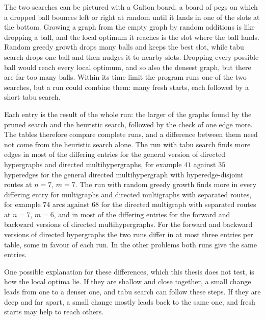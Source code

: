 The two searches can be pictured with a Galton board, a board of pegs on which a dropped ball bounces left or right at random until it lands in one of the slots at the bottom.
Growing a graph from the empty graph by random additions is like dropping a ball, and the local optimum it reaches is the slot where the ball lands.
Random greedy growth drops many balls and keeps the best slot, while tabu search drops one ball and then nudges it to nearby slots.
Dropping every possible ball would reach every local optimum, and so also the densest graph, but there are far too many balls.
Within its time limit the program runs one of the two searches, but a run could combine them: many fresh starts, each followed by a short tabu search.

Each entry is the result of the whole run: the larger of the graphs found by the pruned search and the heuristic search, followed by the check of one edge more. The tables therefore compare complete runs, and a difference between them need not come from the heuristic search alone.
The run with tabu search finds more edges in most of the differing entries for the general version of directed hypergraphs and directed multihypergraphs, for example $41$ against $35$ hyperedges for the general directed multihypergraph with hyperedge-disjoint routes at $n=7$, $m=7$.
The run with random greedy growth finds more in every differing entry for multigraphs and directed multigraphs with separated routes, for example $74$ arcs against $68$ for the directed multigraph with separated routes at $n=7$, $m=6$, and in most of the differing entries for the forward and backward versions of directed multihypergraphs.
For the forward and backward versions of directed hypergraphs the two runs differ in at most three entries per table, some in favour of each run.
In the other problems both runs give the same entries.

One possible explanation for these differences, which this thesis does not test, is how the local optima lie.
If they are shallow and close together, a small change leads from one to a denser one, and tabu search can follow these steps.
If they are deep and far apart, a small change mostly leads back to the same one, and fresh starts may help to reach others.
